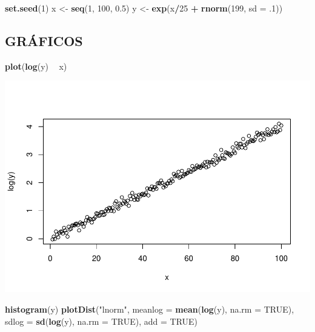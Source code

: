 \documentclass[]{article}
\newenvironment{Shaded}{\begin{snugshade}}{\end{snugshade}}
\newcommand{\KeywordTok}[1]{\textcolor[rgb]{0.13,0.29,0.53}{\textbf{#1}}}
\newcommand{\DataTypeTok}[1]{\textcolor[rgb]{0.13,0.29,0.53}{#1}}
\newcommand{\DecValTok}[1]{\textcolor[rgb]{0.00,0.00,0.81}{#1}}
\newcommand{\FloatTok}[1]{\textcolor[rgb]{0.00,0.00,0.81}{#1}}
\newcommand{\StringTok}[1]{\textcolor[rgb]{0.31,0.60,0.02}{#1}}
\newcommand{\OtherTok}[1]{\textcolor[rgb]{0.56,0.35,0.01}{#1}}
\newcommand{\OperatorTok}[1]{\textcolor[rgb]{0.81,0.36,0.00}{\textbf{#1}}}
\newcommand{\NormalTok}[1]{#1}
\begin{document}
\begin{Shaded}
\begin{Highlighting}[]
\KeywordTok{set.seed}\NormalTok{(}\DecValTok{1}\NormalTok{)}
\NormalTok{x <-}\StringTok{ }\KeywordTok{seq}\NormalTok{(}\DecValTok{1}\NormalTok{, }\DecValTok{100}\NormalTok{, }\FloatTok{0.5}\NormalTok{)}
\NormalTok{y <-}\StringTok{ }\KeywordTok{exp}\NormalTok{(x}\OperatorTok{/}\DecValTok{25} \OperatorTok{+}\StringTok{ }\KeywordTok{rnorm}\NormalTok{(}\DecValTok{199}\NormalTok{, }\DataTypeTok{sd =}\NormalTok{ .}\DecValTok{1}\NormalTok{)) }
\end{Highlighting}
\end{Shaded}

\subsection{GRÁFICOS}\label{graficos}

\begin{Shaded}
\begin{Highlighting}[]
\KeywordTok{plot}\NormalTok{(}\KeywordTok{log}\NormalTok{(y) }\OperatorTok{~}\StringTok{ }\NormalTok{x)}
\end{Highlighting}
\end{Shaded}

\includegraphics{Impacto_sigma_files/figure-latex/unnamed-chunk-3-1.pdf}

\begin{Shaded}
\begin{Highlighting}[]
\KeywordTok{histogram}\NormalTok{(y)}
\KeywordTok{plotDist}\NormalTok{(}\StringTok{"lnorm"}\NormalTok{, }
         \DataTypeTok{meanlog =} \KeywordTok{mean}\NormalTok{(}\KeywordTok{log}\NormalTok{(y), }\DataTypeTok{na.rm =} \OtherTok{TRUE}\NormalTok{),}
         \DataTypeTok{sdlog =} \KeywordTok{sd}\NormalTok{(}\KeywordTok{log}\NormalTok{(y), }\DataTypeTok{na.rm =} \OtherTok{TRUE}\NormalTok{), }
         \DataTypeTok{add =} \OtherTok{TRUE}\NormalTok{)}
\end{Highlighting}
\end{Shaded}
\end{document}
